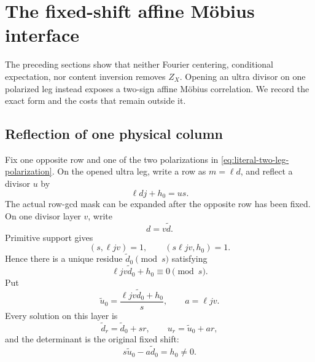 \section{The fixed-shift affine M\"obius interface}
\label{sec:affine-interface}

The preceding sections show that neither Fourier centering,
conditional expectation, nor content inversion removes \(Z_X\).
Opening an ultra divisor on one polarized leg instead exposes a
two-sign affine M\"obius correlation.  We record the exact form and
the costs that remain outside it.

\subsection{Reflection of one physical column}

Fix one opposite row and one of the two polarizations in
\eqref{eq:literal-two-leg-polarization}.  On the opened ultra leg,
write a row as \(m=\ell d\), and reflect a divisor \(u\) by
\begin{equation}
 \ell d j+h_0=us.
 \label{eq:affine-reflection}
\end{equation}
The actual row-gcd mask can be expanded after the opposite row has
been fixed.  On one divisor layer \(v\), write
\[
 d=v\widetilde d.
\]
Primitive support gives
\begin{equation}
 (s,\ell jv)=1,
 \qquad
 (s\ell jv,h_0)=1.
 \label{eq:affine-slope-coprimality}
\end{equation}
Hence there is a unique residue
\(\widetilde d_0\pmod s\) satisfying
\[
 \ell jv\widetilde d_0+h_0\equiv0\pmod s.
\]
Put
\begin{equation}
 \widetilde u_0
 =\frac{\ell jv\widetilde d_0+h_0}{s},
 \qquad
 a=\ell jv.
 \label{eq:affine-origin-a}
\end{equation}
Every solution on this layer is
\begin{equation}
 \widetilde d_r=\widetilde d_0+sr,
 \qquad
 u_r=\widetilde u_0+ar,
 \label{eq:affine-two-forms}
\end{equation}
and the determinant is the original fixed shift:
\begin{equation}
 \boxed{
 s\widetilde u_0-a\widetilde d_0=h_0\ne0.}
 \label{eq:affine-fixed-determinant}
\end{equation}

